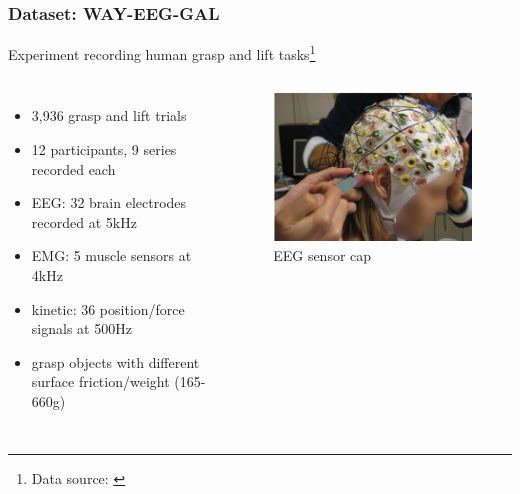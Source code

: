 \documentclass{beamer}
\begin{document}
\begin{frame}
        \frametitle{Dataset: WAY-EEG-GAL}
Experiment recording human grasp and lift tasks\footnote{Data source: \cite{eeg-emg-dataset}}

\begin{columns}
	\begin{itemize}
        \item 3,936 grasp and lift trials
        \item 12 participants, 9 series recorded each
        \item EEG: 32 brain electrodes recorded at 5kHz
        \item EMG: 5 muscle sensors at 4kHz
        \item kinetic: 36 position/force signals at 500Hz
        \item grasp objects with different surface friction/weight (165-660g)
    \end{itemize}
    \begin{figure}[ht]
	    \centering
		\includegraphics[width=1\textwidth, trim={3.5cm 1cm 1cm 1cm},clip]{images/eegelectrodes.png}
		\caption{EEG sensor cap}%
    \end{figure}
\end{columns}
\end{frame}
\end{document}
